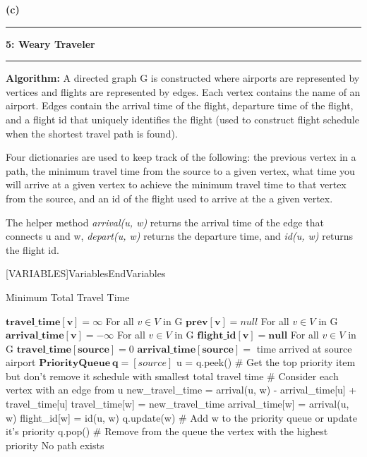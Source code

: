 \documentclass[11pt]{article}
\newcommand\question[2]{\vspace{.25in}\hrule\textbf{#1: #2}\vspace{.5em}\hrule\vspace{.10in}}
\renewcommand\part[1]{\vspace{.10in}\textbf{(#1)}}
\newcommand\algorith{\vspace{.10in}\textbf{Algorithm: }}
\begin{document}
\part{c}

\question{5}{Weary Traveler}

\algorith A directed graph G is constructed where airports are represented by vertices and flights are represented by edges. Each vertex contains the name of an airport. Edges contain the arrival time of the flight, departure time of the flight, and a flight id that uniquely identifies the flight (used to construct flight schedule when the shortest travel path is found).

	Four dictionaries are used to keep track of the following: the previous vertex in a path, the minimum travel time from the source to a given vertex, what time you will arrive at a given vertex to achieve the minimum travel time to that vertex from the source, and an id of the flight used to arrive at the a given vertex.
	
	The helper method \textit{arrival(u, w)} returns the arrival time of the edge that connects u and w, \textit{depart(u, w)} returns the departure time, and \textit{id(u, w)} returns the flight id.
	
	[VARIABLES]{Variables}{EndVariables}
   {\algorithmicvariables}
   {\algorithmicend\ \algorithmicvariables}

\begin{algorithm}[H]
\caption{Minimum Total Travel Time}
\label{CHalgorithm}
\begin{algorithmic}[1]
\Variables
\State $\mathbf{travel\_time[v]} = \infty$ For all $v \in V$ in G
\State $\mathbf{prev[v]} = null$ For all $v \in V$ in G
\State $\mathbf{arrival\_time[v]} = -\infty$ For all $v \in V$ in G
\State $\mathbf{flight\_id[v] = null}$ For all $v \in V$ in G
\State
\State $\mathbf{travel\_time[source]} = 0$
\State $\mathbf{arrival\_time[source]} = $ time arrived at source airport
\State $\mathbf{PriorityQueue\ q} = [source]$
\EndVariables
\State
{}
\State u = q.peek()  \# Get the top priority item but don't remove it
\State \Return schedule with smallest total travel time
\EndIf
{} \# Consider each vertex with an edge from u
\State new\_travel\_time = arrival(u, w) - arrival\_time[u] + travel\_time[u]
\State travel\_time[w] = new\_travel\_time
\State arrival\_time[w] = arrival(u, w)
\State flight\_id[w] = id(u, w)
\State 
\State q.update(w) \# Add w to the priority queue or update it's priority
\EndIf
\EndFor
\State q.pop() \# Remove from the queue the vertex with the highest priority
\EndWhile
\State \Return No path exists
\EndProcedure
\end{algorithmic}
\end{algorithm}
\end{document}
